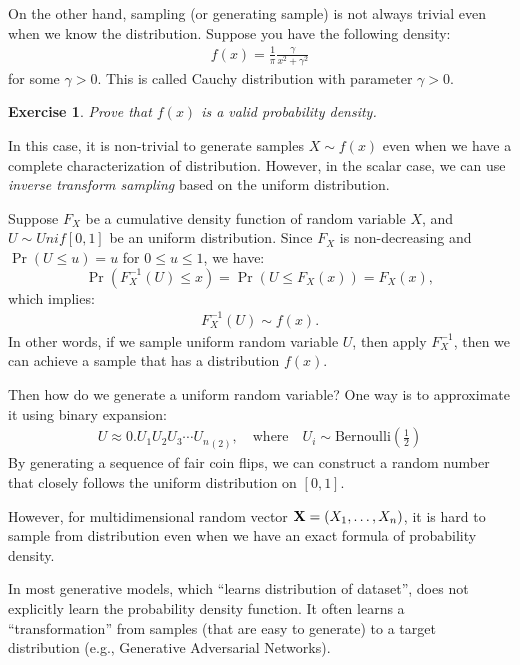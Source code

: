 \documentclass[11pt, a4paper]{article}
\newtheorem{exercise}{Exercise}
\begin{document}
On the other hand, sampling (or generating sample) is not always trivial even when we know the distribution.
Suppose you have the following density:
\begin{align}
    f(x) = \frac{1}{\pi} \frac{\gamma}{x^2+\gamma^2}
\end{align}
for some $\gamma>0$.
This is called Cauchy distribution with parameter $\gamma>0$.

\begin{exercise}
    Prove that $f(x)$ is a valid probability density.
\end{exercise}

In this case, it is non-trivial to generate samples $X\sim f(x)$ even when we have a complete characterization of distribution.
However, in the scalar case, we can use \emph{inverse transform sampling} based on the uniform distribution.

Suppose $F_X$ be a cumulative density function of random variable $X$, and $U\sim Unif[0, 1]$ be an uniform distribution.
Since \(F_X\) is non-decreasing and \(\Pr(U\leq u)=u\) for \(0\leq u \leq 1\), we have:
\begin{equation*}
    \Pr(F_X^{-1}(U)\leq x) = \Pr(U\leq F_X(x)) = F_X(x),
\end{equation*}
which implies:
\begin{align*}
    F_X^{-1}(U) \sim f(x).
\end{align*}
In other words, if we sample uniform random variable $U$, then apply $F^{-1}_X$, then we can achieve a sample that has a distribution $f(x)$.

Then how do we generate a uniform random variable?
One way is to approximate it using binary expansion:
\begin{align*}
    U \approx 0.U_1 U_2 U_3 \cdots {U_n}_{(2)}, \quad\text{where}\quad U_i\sim\mathrm{Bernoulli}\left(\frac{1}{2}\right)
\end{align*}
By generating a sequence of fair coin flips, we can construct a random number that closely follows the uniform distribution on \([0,1]\).

However, for multidimensional random vector ${\bf X}=(X_1, \dots, X_n)$, it is hard to sample from distribution
even when we have an exact formula of probability density.

In most generative models, which ``learns distribution of dataset'', does not explicitly learn the probability density function.
It often learns a ``transformation'' from samples (that are easy to generate) to a target distribution (e.g., Generative Adversarial Networks).
\end{document}
